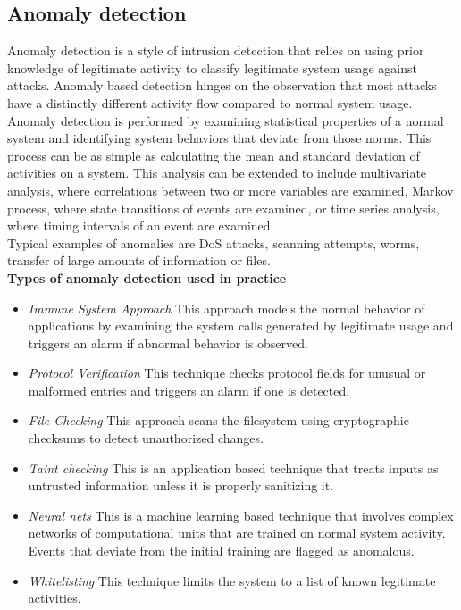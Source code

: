 \documentclass[12pt]{article} %
\begin{document}
\subsection{Anomaly detection}
Anomaly detection is a style of intrusion detection that relies on using prior knowledge of legitimate activity to classify legitimate system usage against attacks. Anomaly based detection hinges on the observation that most attacks have a distinctly different activity flow compared to normal system usage.\\
Anomaly detection is performed by examining statistical properties of a normal system and identifying system behaviors that deviate from those norms. This process can be as simple as calculating the mean and standard deviation of activities on a system. This analysis can be extended to include multivariate analysis, where correlations between two or more variables are examined, Markov process, where state transitions of events are examined, or time series analysis, where timing intervals of an event are examined.\\
Typical examples of anomalies are DoS attacks, scanning attempts, worms, transfer of large amounts of information or files.\\ 

\textbf{Types of anomaly detection used in practice}\cite{verwoerd99}
\begin{itemize}
    \item \textit{Immune System Approach} This approach models the normal behavior of applications by examining the system calls generated by legitimate usage and triggers an alarm if abnormal behavior is observed.\\
    \item \textit{Protocol Verification} This technique checks protocol fields for unusual or malformed entries and triggers an alarm if one is detected.\\
    \item \textit{File Checking} This approach scans the filesystem using cryptographic checksums to detect unauthorized changes.\\
    \item \textit{Taint checking} This is an application based technique that treats inputs as untrusted information unless it is properly sanitizing it.\\
    \item \textit{Neural nets} This is a machine learning based technique that involves complex networks of computational units that are trained on normal system activity. Events that deviate from the initial training are flagged as anomalous.\\
    \item \textit{Whitelisting} This technique limits the system to a list of known legitimate activities.\\
\end{itemize}
\end{document}
